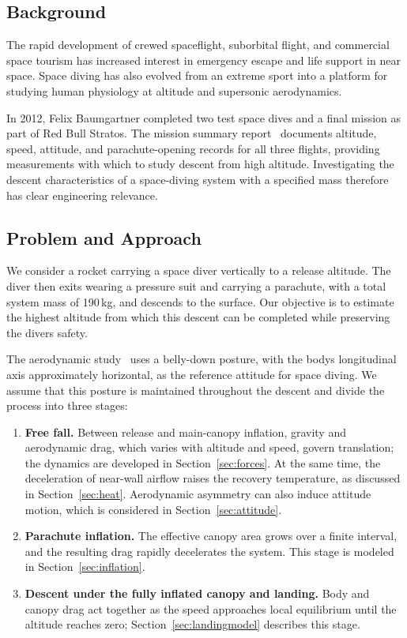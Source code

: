 \documentclass[12pt,a4paper]{article}
\numberwithin{equation}{section}
\begin{document}
\subsection{Background}
The rapid development of crewed spaceflight, suborbital flight, and commercial space tourism has increased interest in emergency escape and life support in near space. Space diving has also evolved from an extreme sport into a platform for studying human physiology at altitude and supersonic aerodynamics.

In 2012, Felix Baumgartner completed two test space dives and a final mission as part of Red Bull Stratos. The mission summary report~\cite{summit} documents altitude, speed, attitude, and parachute-opening records for all three flights, providing measurements with which to study descent from high altitude. Investigating the descent characteristics of a space-diving system with a specified mass therefore has clear engineering relevance.

\subsection{Problem and Approach}
We consider a rocket carrying a space diver vertically to a release altitude. The diver then exits wearing a pressure suit and carrying a parachute, with a total system mass of 190\,kg, and descends to the surface. Our objective is to estimate the highest altitude from which this descent can be completed while preserving the diver\textquotesingle s safety.

The aerodynamic study~\cite{guerster} uses a belly-down posture, with the body\textquotesingle s longitudinal axis approximately horizontal, as the reference attitude for space diving. We assume that this posture is maintained throughout the descent and divide the process into three stages:
\begin{enumerate}
\item \textbf{Free fall.} Between release and main-canopy inflation, gravity and aerodynamic drag, which varies with altitude and speed, govern translation; the dynamics are developed in Section~\ref{sec:forces}. At the same time, the deceleration of near-wall airflow raises the recovery temperature, as discussed in Section~\ref{sec:heat}. Aerodynamic asymmetry can also induce attitude motion, which is considered in Section~\ref{sec:attitude}.
\item \textbf{Parachute inflation.} The effective canopy area grows over a finite interval, and the resulting drag rapidly decelerates the system. This stage is modeled in Section~\ref{sec:inflation}.
\item \textbf{Descent under the fully inflated canopy and landing.} Body and canopy drag act together as the speed approaches local equilibrium until the altitude reaches zero; Section~\ref{sec:landingmodel} describes this stage.
\end{enumerate}
\end{document}
